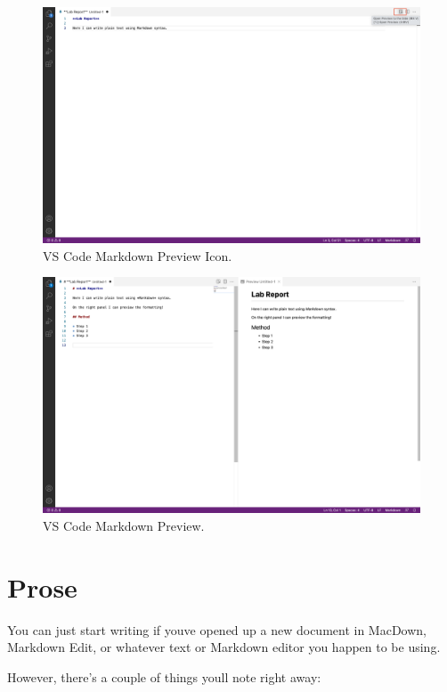 \documentclass[
]{book}
\begin{document}
\begin{figure}
\centering
\includegraphics{images/vs-code-5.png}
\caption{VS Code Markdown Preview Icon.}
\end{figure}

\begin{figure}
\centering
\includegraphics{images/vs-code-6.png}
\caption{VS Code Markdown Preview.}
\end{figure}

\hypertarget{prose}{%
\section{Prose}\label{prose}}

You can just start writing if you\textquotesingle ve opened up a new document in MacDown, Markdown Edit, or whatever text or Markdown editor you happen to be using.

However, there's a couple of things you\textquotesingle ll note right away:
\end{document}
